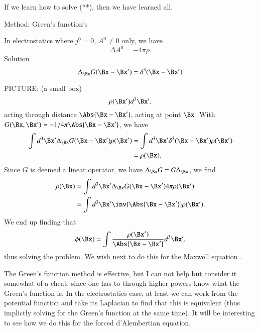 If we learn how to solve (**), then we have learned all.

Method: Green's function's

In electrostatics where \(j^0 = 0\), \(A^0 \ne 0\) only, we have
%
\begin{equation}\label{eqn:relativisticElectrodynamicsL17b:330}
\Delta A^0 = -4 \pi \rho.
\end{equation}
Solution
%
\begin{equation}\label{eqn:relativisticElectrodynamicsL17b:350}
\Delta_{\Bx} G(\Bx - \Bx') = \delta^3( \Bx - \Bx')
\end{equation}

PICTURE: (a small box)
%
\begin{equation}\label{eqn:relativisticElectrodynamicsL17b:370}
\rho(\Bx') d^3 \Bx',
\end{equation}
acting through distance \(\Abs{\Bx - \Bx'}\), acting at point \(\Bx\).  With \(G(\Bx, \Bx') = -1/4 \pi\Abs{\Bx - \Bx'}\), we have
%
\begin{equation}\label{eqn:relativisticElectrodynamicsL17b:410}
\begin{aligned}
\int d^3 \Bx' \Delta_{\Bx} G(\Bx - \Bx') \rho(\Bx')
&= \int d^3 \Bx' \delta^3( \Bx - \Bx') \rho(\Bx') \\
&= \rho(\Bx).
\end{aligned}
\end{equation}
Since \(G\) is deemed a linear operator, we have \(\Delta_\Bx G = G \Delta_\Bx\), we find
%
\begin{equation}\label{eqn:relativisticElectrodynamicsL17b:430}
\begin{aligned}
\rho(\Bx)
&=
\int d^3 \Bx' \Delta_{\Bx} G(\Bx - \Bx') 4 \pi \rho(\Bx') \\
&=
\int d^3 \Bx' \inv{\Abs{\Bx - \Bx'}} \rho(\Bx').
\end{aligned}
\end{equation}
We end up finding that
%
\begin{equation}\label{eqn:relativisticElectrodynamicsL17b:390}
\phi(\Bx) = \int \frac{\rho(\Bx')}{\Abs{\Bx - \Bx'}} d^3 \Bx',
\end{equation}
thus solving the problem.  We wish next to do this for the Maxwell equation .

The Green's function method is effective, but I can not help but consider it somewhat of a cheat, since one has to through higher powers know what the Green's function is.  In the electrostatics case, at least we can work from the potential function and take its Laplacian to find that this is equivalent (thus implictly solving for the Green's function at the same time).  It will be interesting to see how we do this for the forced d'Alembertian equation.
